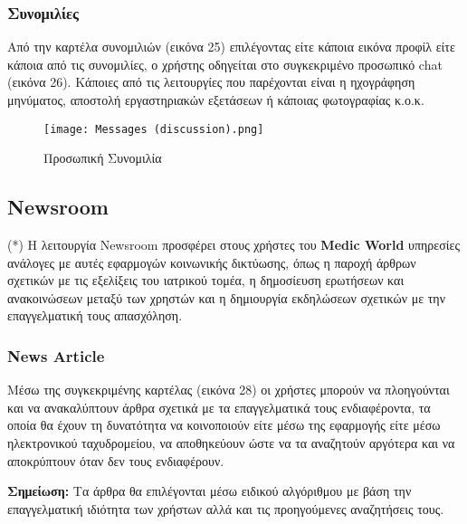 \documentclass{article}
\begin{document}
\subsubsection{Συνομιλίες}

Από την καρτέλα συνομιλιών (εικόνα 25) επιλέγοντας είτε κάποια εικόνα προφίλ είτε κάποια από τις συνομιλίες, ο χρήστης οδηγείται στο συγκεκριμένο προσωπικό chat (εικόνα 26). Κάποιες από τις λειτουργίες που παρέχονται είναι η ηχογράφηση μηνύματος, αποστολή εργαστηριακών εξετάσεων ή κάποιας φωτογραφίας κ.ο.κ.

\vspace{0.3cm}

\begin{figure}[!htb]
\centering
\texttt{[image: Messages (discussion).png]} 
\caption{\label{fig: discussion} Προσωπική Συνομιλία}
\end{figure}

\subsection{Newsroom}

(*) Η λειτουργία Newsroom προσφέρει στους χρήστες του \textbf{Medic World} υπηρεσίες ανάλογες με αυτές εφαρμογών κοινωνικής δικτύωσης, όπως η παροχή άρθρων σχετικών με τις εξελίξεις του ιατρικού τομέα, η δημοσίευση ερωτήσεων και ανακοινώσεων μεταξύ των χρηστών και η δημιουργία εκδηλώσεων σχετικών με την επαγγελματική τους απασχόληση.

\newpage

\subsubsection{News Article}

Μέσω της συγκεκριμένης καρτέλας (εικόνα 28) οι χρήστες μπορούν να πλοηγούνται και να ανακαλύπτουν άρθρα σχετικά με τα επαγγελματικά τους ενδιαφέροντα, τα οποία θα έχουν τη δυνατότητα να κοινοποιούν είτε μέσω της εφαρμογής είτε μέσω ηλεκτρονικού ταχυδρομείου, να αποθηκεύουν ώστε να τα αναζητούν αργότερα και να αποκρύπτουν όταν δεν τους ενδιαφέρουν.

\vspace{0.3cm}

\textbf{Σημείωση:} Τα άρθρα θα επιλέγονται μέσω ειδικού αλγόριθμου με βάση την επαγγελματική ιδιότητα των χρήστων αλλά και τις προηγούμενες αναζητήσεις τους.

\vspace{0.3cm}
\end{document}
